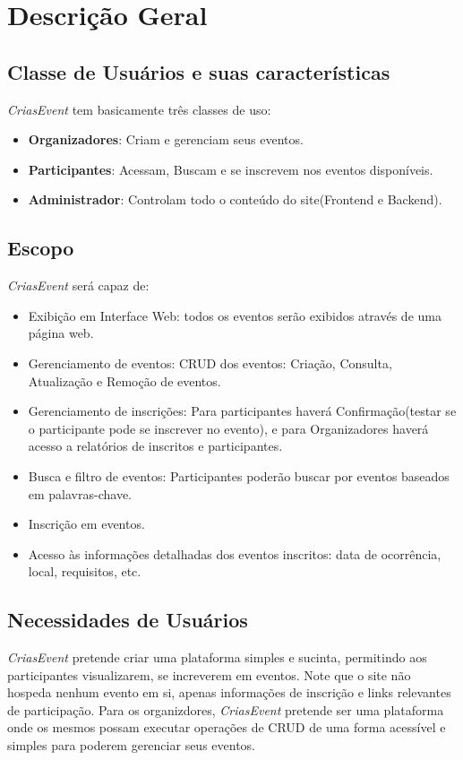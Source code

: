 \chapter{Descrição Geral}
\label{Descrição Geral}

\section{Classe de Usuários e suas características}
\textit{CriasEvent} tem basicamente três classes de uso:
    \begin{itemize}
        \item \textbf{Organizadores}: Criam e gerenciam seus eventos.
        \item \textbf{Participantes}: Acessam, Buscam e se inscrevem nos eventos disponíveis.
        \item \textbf{Administrador}: Controlam todo o conteúdo do site(Frontend e Backend).
    \end{itemize}

\section{Escopo}
    \textit{CriasEvent} será capaz de:
    \begin{itemize}
      \item Exibição em Interface Web: todos os eventos serão exibidos através de uma página web. 
      \item Gerenciamento de eventos: CRUD dos eventos: Criação, Consulta, Atualização e Remoção de eventos.
      \item Gerenciamento de inscrições: Para participantes haverá Conﬁrmação(testar se o participante pode se inscrever no evento), e para Organizadores haverá acesso a relatórios de inscritos e participantes.
      \item Busca e ﬁltro de eventos: Participantes poderão buscar por eventos baseados em palavras-chave.
      \item Inscrição em eventos.
      \item Acesso às informações detalhadas dos eventos inscritos: data de ocorrência, local, requisitos, etc.
    \end{itemize}
\section{Necessidades de Usuários}
	\textit{CriasEvent} pretende criar uma plataforma simples e sucinta, permitindo aos participantes visualizarem, se increverem em eventos. Note que o site não hospeda nenhum evento em si, apenas informações de inscrição e links relevantes de participação. Para os organizdores, \textit{CriasEvent} pretende ser uma plataforma onde os mesmos possam executar operações de CRUD de uma forma acessível e simples para poderem gerenciar seus eventos.

